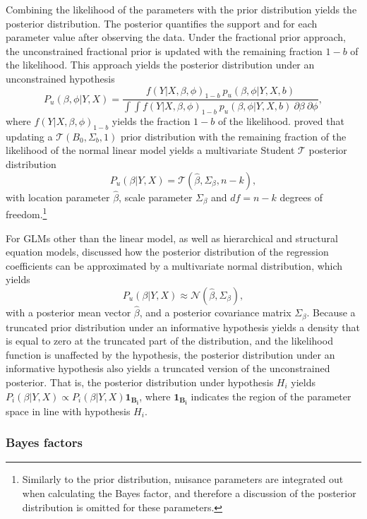 \documentclass[review, 3p, authoryear]{elsarticle} %
\begin{document}
Combining the likelihood of the parameters with the prior distribution yields the posterior distribution.
The posterior quantifies the support and for each parameter value after observing the data.
Under the fractional prior approach, the unconstrained fractional prior is updated with the remaining fraction \(1-b\) of the likelihood.
This approach yields the posterior distribution under an unconstrained hypothesis
\[
P_u(\beta, \phi | Y, X) = 
\frac{
f(Y | X, \beta, \phi)_{1-b} ~ p_u(\beta, \phi | Y, X, b)
}{
\int \int f(Y | X, \beta, \phi)_{1-b} ~ p_u(\beta, \phi | Y, X, b) ~ \partial \beta ~ \partial \phi
},
\]
where \(f(Y | X, \beta, \phi)_{1-b}\) yields the fraction \(1-b\) of the likelihood.
\citet{mulder_olssoncollentine_2019} proved that updating a \(\mathcal{T}(B_0, \Sigma_b, 1)\) prior distribution with the remaining fraction of the likelihood of the normal linear model yields a multivariate Student \(\mathcal{T}\) posterior distribution
\[
P_u(\beta | Y, X) = \mathcal{T}(\hat{\beta}, \Sigma_\beta, n - k),
\]
with location parameter \(\hat{\beta}\), scale parameter \(\Sigma_{\beta}\) and \(df = n - k\) degrees of freedom.\footnote{Similarly to the prior distribution, nuisance parameters are integrated out when calculating the Bayes factor, and therefore a discussion of the posterior distribution is omitted for these parameters.}

For GLMs other than the linear model, as well as hierarchical and structural equation models, \citet{gu_approximated_2018} discussed how the posterior distribution of the regression coefficients can be approximated by a multivariate normal distribution, which yields
\[
P_u(\beta | Y, X) \approx \mathcal{N}(\hat{\beta}, \Sigma_\beta),
\]
with a posterior mean vector \(\hat{\beta}\), and a posterior covariance matrix \(\Sigma_\beta\).
Because a truncated prior distribution under an informative hypothesis yields a density that is equal to zero at the truncated part of the distribution, and the likelihood function is unaffected by the hypothesis, the posterior distribution under an informative hypothesis also yields a truncated version of the unconstrained posterior.
That is, the posterior distribution under hypothesis \(H_i\) yields
\(P_i(\beta | Y, X) \propto P_i(\beta | Y, X)\boldsymbol{1}_{\boldsymbol{B_i}}\), where \(\boldsymbol{1}_{\boldsymbol{B_i}}\) indicates the region of the parameter space in line with hypothesis \(H_i\).

\hypertarget{bayes-factors}{%
\subsubsection{Bayes factors}\label{bayes-factors}}
\end{document}
